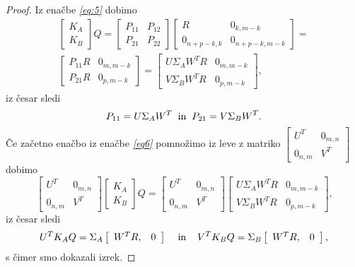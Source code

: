 \documentclass[mat1]{article}
\begin{document}
\begin{proof}
Iz enačbe  \textit{\eqref{eq:5}} dobimo
\begin{equation} \label{eq6}
\begin{split}
\begin{bmatrix} 
K_A \\
K_B 
\end{bmatrix} Q =
\begin{bmatrix} 
P_{11} & P_{12} \\
P_{21} & P_{22} 
\end{bmatrix}
\begin{bmatrix} 
R & 0_{k, m-k} \\
0_{n+p-k, k} & 0_{n+p-k, m-k}  
\end{bmatrix} =
\\
\begin{bmatrix} 
P_{11}R & 0_{m, m-k} \\
P_{21}R & 0_{p, m-k} 
\end{bmatrix} =
\begin{bmatrix} 
U \Sigma_A W^T R & 0_{m, m-k} \\
V \Sigma_B W^T R & 0_{p, m-k} 
\end{bmatrix} \text{,}
\end{split}
\end{equation}
iz česar sledi
$$
P_{11} = U \Sigma_A W^T
\hspace{2mm} \text{in} \hspace{2mm}
P_{21} = V \Sigma_B W^T \text{.}
$$
Če začetno enačbo iz enačbe \textit{\eqref{eq6}} pomnožimo iz leve z matriko 
$
\begin{bmatrix}
U^T & 0_{m, n} \\
0_{n, m} & V^T
\end{bmatrix}
$ dobimo 
$$
\begin{bmatrix}
U^T & 0_{m, n} \\
0_{n, m} & V^T
\end{bmatrix}
\begin{bmatrix} 
K_A \\
K_B 
\end{bmatrix} Q =
\begin{bmatrix}
U^T & 0_{m, n} \\
0_{n, m} & V^T
\end{bmatrix}
\begin{bmatrix} 
U \Sigma_A W^T R & 0_{m, m-k} \\
V \Sigma_B W^T R & 0_{p, m-k} 
\end{bmatrix} \text{,}
$$
iz česar sledi
$$
U^T K_A Q = 
\Sigma_A  \left[\begin{array}{cc} W^T R, & 0 \end{array}\right] \hspace{4mm} \text{in} \hspace{4mm} V^T K_B Q = \Sigma_B  \left[\begin{array}{cc} W^T R, & 0 \end{array}\right] \text{,}
$$
s čimer smo dokazali izrek.
\end{proof}
\end{document}
